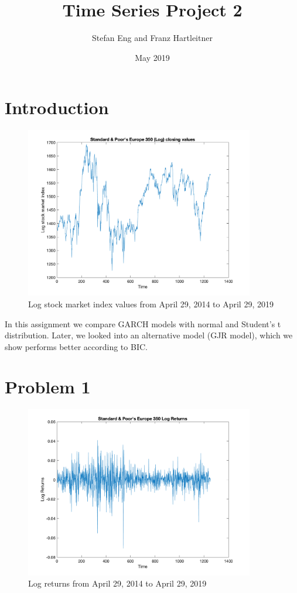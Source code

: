 \documentclass{article}
\title{Time Series Project 2}
\author{Stefan Eng and Franz Hartleitner}
\date{May 2019}
\begin{document}
\maketitle

\section{Introduction}

\begin{figure}[H]
  \centering
\includegraphics[width=10cm]{plots/log_index.png}
\centering
\caption{Log stock market index values from April 29, 2014 to April 29, 2019}
\label{fig:log_index}
\end{figure}

In this assignment we compare GARCH models with normal and Student's t distribution.
Later, we looked into an alternative model (GJR model), which we show performs better according to BIC.


\section*{Problem 1}

\begin{figure}[H]
  \centering
\includegraphics[width=10cm]{plots/returns.png}
\centering
\caption{Log returns from April 29, 2014 to April 29, 2019}
\label{fig:returns}
\end{figure}
\end{document}
